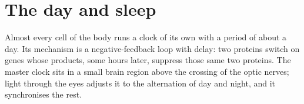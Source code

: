 \section{The day and sleep}
Almost every cell of the body runs a clock of its own with a period of about a day. Its mechanism is a negative-feedback loop with delay: two proteins switch on genes whose products, some hours later, suppress those same two proteins. The master clock sits in a small brain region above the crossing of the optic nerves; light through the eyes adjusts it to the alternation of day and night, and it synchronises the rest.

